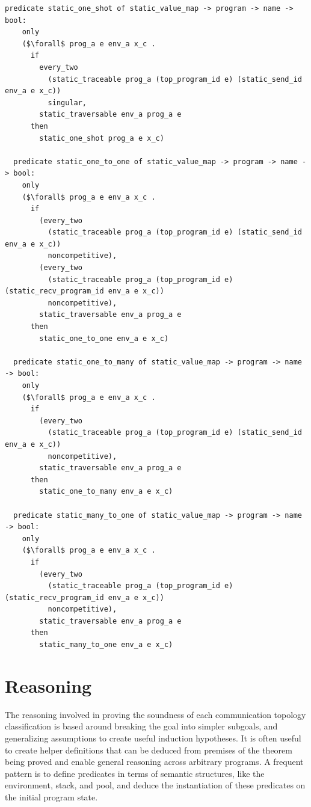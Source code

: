 \documentclass{article}
\begin{document}
\begin{lstlisting}[language=logic, mathescape]
  predicate static_one_shot of static_value_map -> program -> name -> bool:
    only
    ($\forall$ prog_a e env_a x_c .
      if
        every_two
          (static_traceable prog_a (top_program_id e) (static_send_id env_a e x_c))
          singular,
        static_traversable env_a prog_a e
      then
        static_one_shot prog_a e x_c)

  predicate static_one_to_one of static_value_map -> program -> name -> bool:
    only
    ($\forall$ prog_a e env_a x_c .
      if
        (every_two
          (static_traceable prog_a (top_program_id e) (static_send_id env_a e x_c))
          noncompetitive), 
        (every_two
          (static_traceable prog_a (top_program_id e) (static_recv_program_id env_a e x_c))
          noncompetitive), 
        static_traversable env_a prog_a e
      then
        static_one_to_one env_a e x_c)

  predicate static_one_to_many of static_value_map -> program -> name -> bool:
    only
    ($\forall$ prog_a e env_a x_c .
      if
        (every_two
          (static_traceable prog_a (top_program_id e) (static_send_id env_a e x_c))
          noncompetitive),
        static_traversable env_a prog_a e
      then
        static_one_to_many env_a e x_c) 

  predicate static_many_to_one of static_value_map -> program -> name -> bool:
    only
    ($\forall$ prog_a e env_a x_c .
      if
        (every_two
          (static_traceable prog_a (top_program_id e) (static_recv_program_id env_a e x_c))
          noncompetitive),
        static_traversable env_a prog_a e
      then
        static_many_to_one env_a e x_c) 
\end{lstlisting}

\section{Reasoning}
The reasoning involved in proving the soundness of each communication topology classification
is based around breaking the goal into simpler subgoals, and generalizing assumptions to create
useful induction hypotheses.  It is often useful to
create helper definitions that can be deduced
from premises of the theorem being proved and enable
general reasoning across arbitrary programs.
A frequent pattern is to define
predicates in terms of semantic structures, like the environment, stack, and pool, and deduce 
the instantiation of these predicates on the initial program state. 
\end{document}
